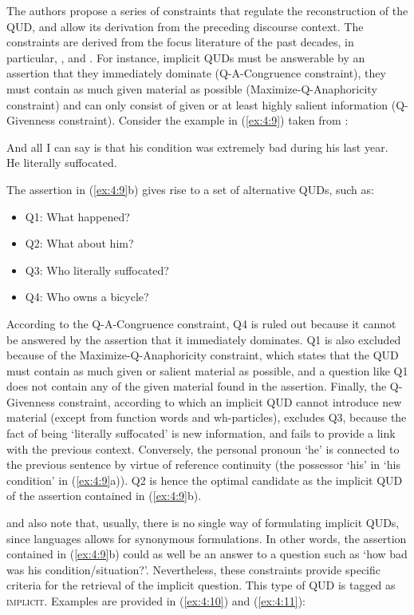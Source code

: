 The authors propose a series of constraints that regulate the reconstruction of the QUD, and allow its derivation from the preceding discourse context. The constraints are derived from the focus literature of the past decades, in particular, \textcite{rooth1992theory}, \textcite{schwarzschild1999givenness} and \textcite{buring2009towards}. For instance, implicit QUDs must be answerable by an assertion that they immediately dominate (Q-A-Congruence constraint), they must contain as much given material as possible (Maximize-Q-Anaphoricity constraint) and can only consist of given or at least highly salient information (Q-Givenness constraint). Consider the example in (\ref{ex:4:9}) taken from \textcite{riester2019constructing}:

\ea \label{ex:4:9}
\ea And all I can say is that his condition was extremely bad during his last year.\\

\ex He literally suffocated. \hfill \parencite[9]{riester2019constructing}     
\z \z

 The assertion in (\ref{ex:4:9}b) gives rise to a set of alternative QUDs, such as:
\begin{itemize}
	\item Q1: What happened?
	\item Q2: What about him?
	\item Q3: Who literally suffocated?
	\item Q4: Who owns a bicycle?
\end{itemize}


According to the Q-A-Congruence constraint, Q4 is ruled out because it cannot be answered by the assertion that it immediately dominates. Q1 is also excluded because of the Maximize-Q-Anaphoricity constraint, which states that the QUD must contain as much given or salient material as possible, and a question like Q1 does not contain any of the given material found in the assertion. Finally, the Q-Givenness constraint, according to which an implicit QUD cannot introduce new material (except from function words and wh-particles), excludes Q3, because the fact of being ‘literally suffocated’ is new information, and fails to provide a link with the previous context. Conversely, the personal pronoun ‘he’ is connected to the previous sentence by virtue of reference continuity (the possessor 
`his' in ‘his condition' in (\ref{ex:4:9}a)). Q2 is hence the optimal candidate as the implicit QUD of the assertion contained in (\ref{ex:4:9}b).

\textcite{riester2018annotation} and \textcite{riester2019constructing} also note that, usually, there is no single way of formulating implicit QUDs, since languages allows for synonymous formulations. In other words, the assertion contained in (\ref{ex:4:9}b) could as well be an answer to a question such as ‘how bad was his condition/situation?’. Nevertheless, these constraints provide specific criteria for the retrieval of the implicit question. This type of QUD is tagged as \textsc{implicit}. Examples are provided in (\ref{ex:4:10}) and (\ref{ex:4:11}):

